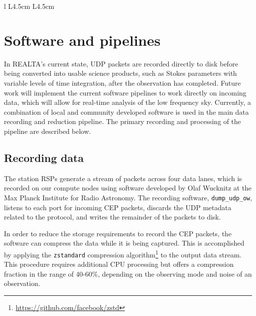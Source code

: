 \begin{table*}
\begin{tabular}{l L{4.5cm} L{4.5cm}}
\end{tabular}

\caption[Table of hardware specifications for REALTA.]{Table of hardware specifications for REALTA. Note that the specifications are given for individual UCC 1-4 compute nodes, except for storage which is the total amount dedicated to archival of data distributed across all four. }
\label{table:REALTAspecs}
\end{table*}

\section{Software and pipelines}
\label{sec:softwareAndProcessing}
In REALTA's current state, UDP packets are recorded directly to disk before being converted into usable science products, such as Stokes parameters with variable levels of time integration, after the observation has completed. Future work will implement the current software pipelines to work directly on incoming data, which will allow for real-time analysis of the low frequency sky. Currently, a combination of local and community developed software is used in the main data recording and reduction pipeline. The primary recording and processing of the pipeline are described below.

\subsection{Recording data}
\label{sec:preproc}
The station RSPs generate a stream of packets across four data lanes, which is recorded on our compute nodes using software developed by Olaf Wucknitz at the Max Planck Institute for Radio Astronomy. The recording software, \texttt{dump\_udp\_ow}, listens to each port for incoming CEP packets, discards the UDP metadata related to the protocol, and writes the remainder of the packets to disk.

In order to reduce the storage requirements to record the CEP packets, the software can compress the data while it is being captured. This is accomplished by applying the \texttt{zstandard} compression algorithm\footnote{\hyperref[zstandard]{https://github.com/facebook/zstd}} to the output data stream. This procedure requires additional CPU processing but offers a compression fraction in the range of 40-60\%, depending on the observing mode and noise of an observation.

